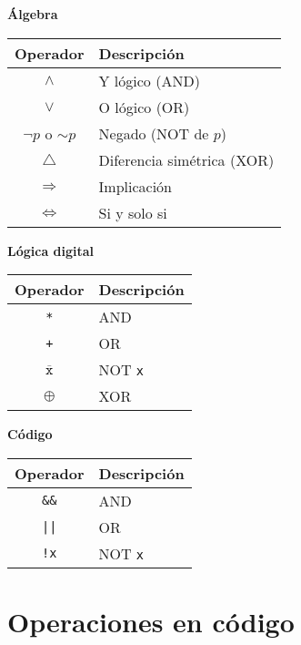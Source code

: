 \documentclass[a4paper,10pt]{article}
\begin{document}
\begin{multicols}{3}
    \begin{center}
    \textbf{Álgebra}\\
    \begin{tabular}{c|p{3.2cm}}
    \small Operador & \small Descripción\\
    \hline
    $\wedge$           & \small Y lógico {\footnotesize (AND)} \\
    $\vee$             & \small O lógico {\footnotesize (OR)} \\
    $\neg$$p$ o $\sim$$p$  & \small Negado {\footnotesize (NOT de $p$)}\\
    $\bigtriangleup$   & \small Diferencia simétrica {\footnotesize (XOR)}\\
    $\Rightarrow$      & \small Implicación \\
    $\Leftrightarrow$  & \small Si y solo si \\
    \end{tabular}
    \end{center}
\columnbreak
    \begin{center}
    \textbf{Lógica digital}\\
    \begin{tabular}{c|p{2.7cm}}
    \small Operador & \small Descripción\\
    \hline
    \verb|*|    & \small AND \\
    \verb|+|    & \small OR \\
    $\overline{\texttt{x}}$ & \small NOT \verb|x| \\
    $\oplus$    & \small XOR \\
    \end{tabular}
    \end{center}
\columnbreak
    \begin{center}
    \textbf{Código}\\
    \begin{tabular}{c|p{2.7cm}}
    \small Operador & \small Descripción\\
    \hline
    \verb|&&|    & \small AND \\
    \verb.||.    & \small OR \\
    \verb|!x|    & \small NOT \verb|x| \\
    \end{tabular}
    \end{center}
\end{multicols}

\section*{Operaciones en código}
 
\end{document}

